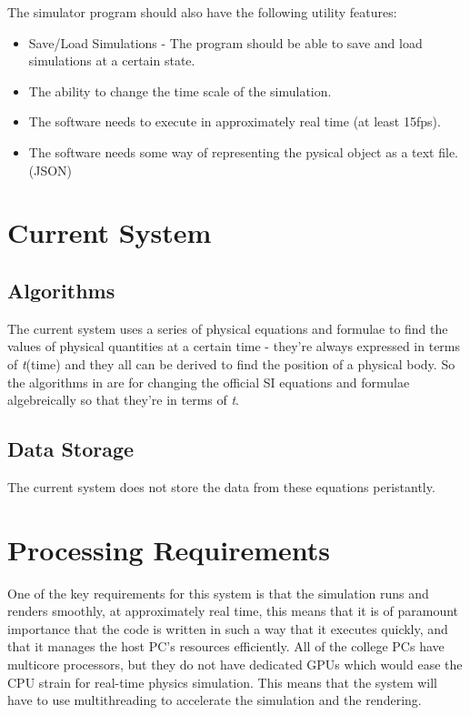 The simulator program should also have the following utility features:
\begin{itemize}
	\item Save/Load Simulations - The program should be able to save and load simulations at a certain state.
	\item The ability to change the time scale of the simulation.
	\item The software needs to execute in approximately real time (at least 15fps).
	\item The software needs some way of representing the pysical object as a text file. (JSON)

\end{itemize}

\section{Current System}

	\subsection{Algorithms}
		The current system uses a series of physical equations and formulae to find the values of physical quantities at a certain time - they're always expressed in terms of \textit{t}(time) and they all can be derived to find the position of a physical body. So the algorithms in are for changing the official SI equations and formulae algebreically so that they're in terms of \textit{t}.
	\subsection{Data Storage}
		The current system does not store the data from these equations peristantly.

\section{Processing Requirements}
One of the key requirements for this system is that the simulation runs and renders smoothly, at approximately real time, this means that it is of paramount importance that the code is written in such a way that it executes quickly, and that it manages the host PC's resources efficiently. All of the college PCs have multicore processors, but they do not have dedicated GPUs which would ease the CPU strain for real-time physics simulation. This means that the system will have to use multithreading to accelerate the simulation and the rendering.

